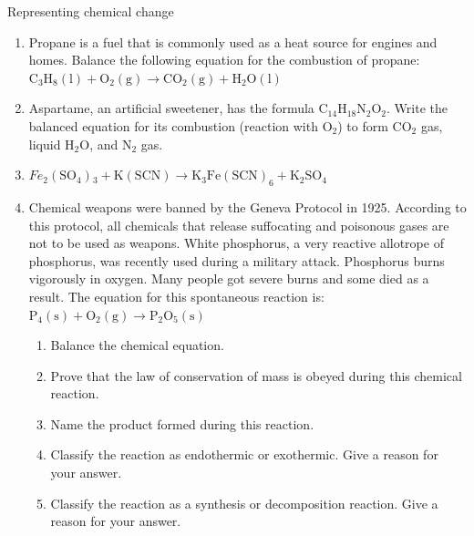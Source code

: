             \begin{eocexercises}{Representing chemical change}
            \nopagebreak
      \label{m38727*id67334}\begin{enumerate}[noitemsep, label=\textbf{\arabic*}. ] 
            \label{m38727*uid45}\item Propane is a fuel that is commonly used as a heat source for engines and homes. Balance the following equation for the combustion of propane:
        ${\mathrm{C}}_{3}{\mathrm{H}}_{8}\left(\mathrm{l}\right)+\mathrm{O}{}_{2}\left(\mathrm{g}\right)\to \mathrm{CO}{}_{2}\left(\mathrm{g}\right)+\mathrm{H}{}_{2}\mathrm{O}\left(\mathrm{l}\right)$
        \label{m38727*uid46}\item Aspartame, an artificial sweetener, has the formula ${\mathrm{C}}_{14}{\mathrm{H}}_{18}{\mathrm{N}}_{2}{\mathrm{O}}_{2}$. Write the balanced equation for its combustion (reaction with ${\mathrm{O}}_{2}$) to form ${\mathrm{CO}}_{2}$ gas, liquid $\mathrm{H}{}_{2}\mathrm{O}$, and ${\mathrm{N}}_{2}$ gas.
        \label{m38727*uid47}\item 
${Fe}_{2}\left({\mathrm{SO}}_{4}\right){}_{3}+\mathrm{K\left(SCN\right)}\to {\mathrm{K}}_{3}{\mathrm{Fe\left(SCN\right)}}_{6}+{\mathrm{K}}_{2}{\mathrm{SO}}_{4}$
                \label{m38727*uid48}\item Chemical weapons were banned by the Geneva Protocol in 1925. According to this protocol, all chemicals that release suffocating and poisonous gases are not to be used as weapons. White phosphorus, a very reactive allotrope of phosphorus, was recently used during a military attack. Phosphorus burns vigorously in oxygen. Many people got severe burns and some died as a result. The equation for this spontaneous reaction is:
        ${\mathrm{P}}_{4}\left(\mathrm{s}\right)+{\mathrm{O}}_{2}\left(\mathrm{g}\right)\to {\mathrm{P}}_{2}{\mathrm{O}}_{5}\left(\mathrm{s}\right)$\label{m38727*id67821}\begin{enumerate}[noitemsep, label=\textbf{\alph*}. ] 
            \label{m38727*uid49}\item Balance the chemical equation.
\label{m38727*uid50}\item Prove that the law of conservation of mass is obeyed during this chemical reaction.
\label{m38727*uid51}\item Name the product formed during this reaction.
\label{m38727*uid52}\item Classify the reaction as endothermic or exothermic. Give a reason for your answer.
\label{m38727*uid53}\item Classify the reaction as a synthesis or decomposition reaction. Give a reason for your answer.

\end{enumerate}
\end{enumerate}
\end{eocexercises}
